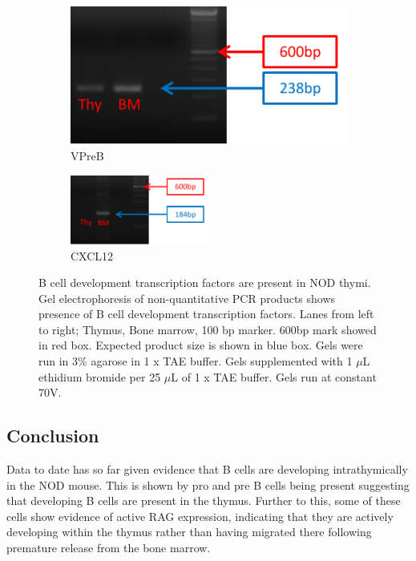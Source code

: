 \begin{figure}
	\begin{subfigure}{0.5\textwidth}
	\centering
	\includegraphics[width=\textwidth]{Figures/VPreB.pdf}
	\caption{VPreB}
	\end{subfigure}
	\begin{subfigure}{\textwidth}
	\centering
	\includegraphics[width=0.5\textwidth]{Figures/CXCL12.pdf}
	\caption{CXCL12}
	\end{subfigure}
\caption{B cell development transcription factors are present in NOD thymi.
Gel electrophoresis of non-quantitative PCR products shows presence of B cell development transcription factors.
Lanes from left to right; Thymus, Bone marrow, 100 bp marker. 
600bp mark showed in red box.
Expected product size is shown in blue box.
Gels were run in 3\% agarose in 1 x TAE buffer. Gels supplemented with 1 $\mu$L ethidium bromide per 25 $\mu$L of 1 x TAE buffer. Gels run at constant 70V. }
\label{fig:gels}
\end{figure}



\subsection{Conclusion}

Data to date has so far given evidence that B cells are developing intrathymically in the NOD mouse.
This is shown by pro and pre B cells being present suggesting that developing B cells are present in the thymus.
Further to this, some of these cells show evidence of active RAG expression, indicating that they are actively developing within the thymus rather than having migrated there following premature release from the bone marrow.

